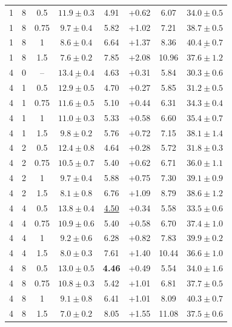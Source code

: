 \documentclass{article}
\begin{document}
\begin{table}[!htbp]
\begin{tabular}{cccccccc}
1 & 8 & 0.5 & $11.9\pm0.3$ & 4.91 & +0.62 & 6.07 & $34.0\pm0.5$\\
1 & 8 & 0.75 & $9.7\pm0.4$ & 5.82 & +1.02 & 7.21 & $38.7\pm0.5$\\
1 & 8 & 1 & $8.6\pm0.4$ & 6.64 & +1.37 & 8.36 & $\underline{40.4\pm0.7}$\\
1 & 8 & 1.5 & $7.6\pm0.2$ & 7.85 & +2.08 & 10.96 & $37.6\pm1.2$\\
\midrule
4 & 0 & -- & $\underline{13.4\pm0.4}$& 4.63 & +0.31 & 5.84 & $30.3\pm0.6$\\
4 & 1 & 0.5 & $12.9\pm0.5$ & 4.70 & +0.27 & 5.85 & $31.2\pm0.5$\\
4 & 1 & 0.75 & $11.6\pm0.5$ & 5.10 & +0.44 & 6.31 & $34.3\pm0.4$\\
4 & 1 & 1 & $11.0\pm0.3$ & 5.33 & +0.58 & 6.60 & $35.4\pm0.7$\\
4 & 1 & 1.5 & $9.8\pm0.2$ & 5.76 & +0.72 & 7.15 & $38.1\pm1.4$\\
4 & 2 & 0.5 & $12.4\pm0.8$ & 4.64 & +0.28 & 5.72 & $31.8\pm0.3$\\
4 & 2 & 0.75 & $10.5\pm0.7$ & 5.40 & +0.62 & 6.71 & $36.0\pm1.1$\\
4 & 2 & 1 & $9.7\pm0.4$ & 5.88 & +0.75 & 7.30 & $39.1\pm0.9$\\
4 & 2 & 1.5 & $8.1\pm0.8$ & 6.76 & +1.09 & 8.79 & $38.6\pm1.2$\\
4 & 4 & 0.5 & $\mathbf{13.8\pm0.4}$& \underline{4.50}& +0.34 & 5.58 & $33.5\pm0.6$\\
4 & 4 & 0.75 & $10.9\pm0.6$ & 5.40 & +0.58 & 6.70 & $37.4\pm1.0$\\
4 & 4 & 1 & $9.2\pm0.6$ & 6.28 & +0.82 & 7.83 & $39.9\pm0.2$\\
4 & 4 & 1.5 & $8.0\pm0.3$ & 7.61 & +1.40 & 10.44 & $36.6\pm1.0$\\
4 & 8 & 0.5 & $13.0\pm0.5$ & \textbf{4.46}& +0.49 & 5.54 & $34.0\pm1.6$\\
4 & 8 & 0.75 & $10.8\pm0.3$ & 5.42 & +1.01 & 6.81 & $37.7\pm0.5$\\
4 & 8 & 1 & $9.1\pm0.8$ & 6.41 & +1.01 & 8.09 & $40.3\pm0.7$\\
4 & 8 & 1.5 & $7.0\pm0.2$ & 8.05 & +1.55 & 11.08 & $37.5\pm0.6$\\
\bottomrule
\end{tabular}
\end{table}
\clearpage
\end{document}
